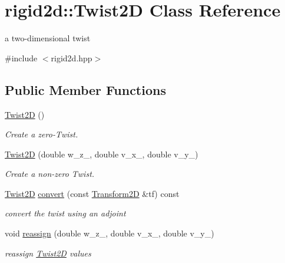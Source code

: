 \hypertarget{classrigid2d_1_1Twist2D}{}\section{rigid2d\+:\+:Twist2D Class Reference}
\label{classrigid2d_1_1Twist2D}


a two-\/dimensional twist  




{\ttfamily \#include $<$rigid2d.\+hpp$>$}

\subsection*{Public Member Functions}
\begin{DoxyCompactItemize}
\item 
\mbox{\label{classrigid2d_1_1Twist2D_a8a317315c9dc111b01e0f3c53af072b4}} 
\hyperlink{classrigid2d_1_1Twist2D_a8a317315c9dc111b01e0f3c53af072b4}{Twist2D} ()
\begin{DoxyCompactList}\small\item\em Create a zero-\/\+Twist. \end{DoxyCompactList}\item 
\mbox{\label{classrigid2d_1_1Twist2D_ac08464a283d6577dd5daffb82b2652ce}} 
\hyperlink{classrigid2d_1_1Twist2D_ac08464a283d6577dd5daffb82b2652ce}{Twist2D} (double w\+\_\+z\+\_\+, double v\+\_\+x\+\_\+, double v\+\_\+y\+\_\+)
\begin{DoxyCompactList}\small\item\em Create a non-\/zero Twist. \end{DoxyCompactList}\item 
\hyperlink{classrigid2d_1_1Twist2D}{Twist2D} \hyperlink{classrigid2d_1_1Twist2D_af5d38e8a9b62c7f414453ea37e012697}{convert} (const \hyperlink{classrigid2d_1_1Transform2D}{Transform2D} \&tf) const
\begin{DoxyCompactList}\small\item\em convert the twist using an adjoint \end{DoxyCompactList}\item 
\mbox{\label{classrigid2d_1_1Twist2D_af9c23f13a251cbb56210a9fa870102ea}} 
void \hyperlink{classrigid2d_1_1Twist2D_af9c23f13a251cbb56210a9fa870102ea}{reassign} (double w\+\_\+z\+\_\+, double v\+\_\+x\+\_\+, double v\+\_\+y\+\_\+)
\begin{DoxyCompactList}\small\item\em reassign \hyperlink{classrigid2d_1_1Twist2D}{Twist2D} values \end{DoxyCompactList}\end{DoxyCompactItemize}
